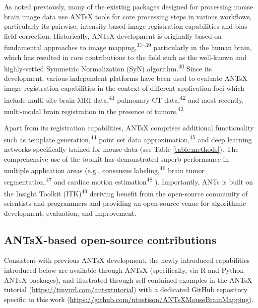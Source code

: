 \documentclass[
  12pt,
]{article}
\begin{document}
As noted previously, many of the existing packages designed for
processing mouse brain image data use ANTsX tools for core processing
steps in various workflows, particularly its pairwise, intensity-based
image registration capabilities and bias field correction. Historically,
ANTsX development is originally based on fundamental approaches to image
mapping,\textsuperscript{37--39} particularly in the human brain, which
has resulted in core contributions to the field such as the well-known
and highly-vetted Symmetric Normalization (SyN)
algorithm.\textsuperscript{40} Since its development, various
independent platforms have been used to evaluate ANTsX image
registration capabilities in the context of different application foci
which include multi-site brain MRI data,\textsuperscript{41} pulmonary
CT data,\textsuperscript{42} and most recently, multi-modal brain
registration in the presence of tumors.\textsuperscript{43}



Apart from its registration capabilities, ANTsX comprises additional
functionality such as template generation,\textsuperscript{44} point set
data approximation,\textsuperscript{45} and deep learning networks
specifically trained for mouse data (see Table \ref{table:methods}). The
comprehensive use of the toolkit has demonstrated superb performance in
multiple application areas (e.g., consensus
labeling,\textsuperscript{46} brain tumor
segmentation,\textsuperscript{47} and cardiac motion
estimation\textsuperscript{48} ). Importantly, ANTs is built on the
Insight Toolkit (ITK)\textsuperscript{49} deriving benefit from the
open-source community of scientists and programmers and providing an
open-source venue for algorithmic development, evaluation, and
improvement.

\hypertarget{antsx-based-open-source-contributions}{%
\subsection{ANTsX-based open-source
contributions}\label{antsx-based-open-source-contributions}}

Consistent with previous ANTsX development, the newly introduced
capabilities introduced below are available through ANTsX (specifically,
via R and Python ANTsX packages), and illustrated through self-contained
examples in the ANTsX tutorial (\url{https://tinyurl.com/antsxtutorial})
with a dedicated GitHub repository specific to this work
(\url{https://github.com/ntustison/ANTsXMouseBrainMapping}).
\end{document}
